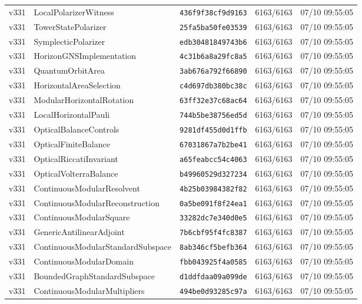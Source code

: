 \documentclass[11pt]{article}
\theoremstyle{definition}\newtheorem{deriv}{Derivação}
\begin{document}
{\begin{longtable}{@{}lllll@{}}
v331 & LocalPolarizerWitness & \texttt{436f9f38cf9d9163} & 6163/6163 & 07/10 09:55:05 \\
v331 & TowerStatePolarizer & \texttt{25fa5ba50fe03539} & 6163/6163 & 07/10 09:55:05 \\
v331 & SymplecticPolarizer & \texttt{edb30481849743b6} & 6163/6163 & 07/10 09:55:05 \\
v331 & HorizonGNSImplementation & \texttt{4c31b6a8a29fc8a5} & 6163/6163 & 07/10 09:55:05 \\
v331 & QuantumOrbitArea & \texttt{3ab676a792f66890} & 6163/6163 & 07/10 09:55:05 \\
v331 & HorizontalAreaSelection & \texttt{c4d697db380bc38c} & 6163/6163 & 07/10 09:55:05 \\
v331 & ModularHorizontalRotation & \texttt{63ff32e37c68ac64} & 6163/6163 & 07/10 09:55:05 \\
v331 & LocalHorizontalPauli & \texttt{744b5be38756ed5d} & 6163/6163 & 07/10 09:55:05 \\
v331 & OpticalBalanceControls & \texttt{9281df455d0d1ffb} & 6163/6163 & 07/10 09:55:05 \\
v331 & OpticalFiniteBalance & \texttt{67031867a7b2be41} & 6163/6163 & 07/10 09:55:05 \\
v331 & OpticalRiccatiInvariant & \texttt{a65feabcc54c4063} & 6163/6163 & 07/10 09:55:05 \\
v331 & OpticalVolterraBalance & \texttt{b49960529d327234} & 6163/6163 & 07/10 09:55:05 \\
v331 & ContinuousModularResolvent & \texttt{4b25b03984382f82} & 6163/6163 & 07/10 09:55:05 \\
v331 & ContinuousModularReconstruction & \texttt{0a5be091f8f24ea1} & 6163/6163 & 07/10 09:55:05 \\
v331 & ContinuousModularSquare & \texttt{33282dc7e340d0e5} & 6163/6163 & 07/10 09:55:05 \\
v331 & GenericAntilinearAdjoint & \texttt{7b6cbf95f4fc8387} & 6163/6163 & 07/10 09:55:05 \\
v331 & ContinuousModularStandardSubspace & \texttt{8ab346cf5befb364} & 6163/6163 & 07/10 09:55:05 \\
v331 & ContinuousModularDomain & \texttt{fbb043925f4a0585} & 6163/6163 & 07/10 09:55:05 \\
v331 & BoundedGraphStandardSubspace & \texttt{d1ddfdaa09a099de} & 6163/6163 & 07/10 09:55:05 \\
v331 & ContinuousModularMultipliers & \texttt{494be0d93285c97a} & 6163/6163 & 07/10 09:55:05 \\

\end{longtable}}
\end{document}
